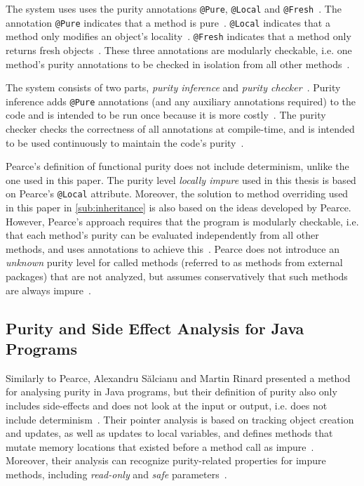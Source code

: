 \documentclass[a4paper,12pt]{article}
\begin{document}
The system uses uses the purity annotations \texttt{@Pure}, \texttt{@Local} and \texttt{@Fresh}~\cite{pearce2011jpure}. The annotation \texttt{@Pure} indicates that a method is pure~\cite{pearce2011jpure}. \texttt{@Local} indicates that a method only modifies an object's locality~\cite{pearce2011jpure}. \texttt{@Fresh} indicates that a method only returns fresh objects~\cite{pearce2011jpure}. These three annotations are modularly checkable, i.e. one method's purity annotations to be checked in isolation from all other methods~\cite{pearce2011jpure}.

The system consists of two parts, \textit{purity inference} and \textit{purity checker}~\cite{pearce2011jpure}. Purity inference adds \texttt{@Pure} annotations (and any auxiliary annotations required) to the code and is intended to be run once because it is more costly~\cite{pearce2011jpure}. The purity checker checks the correctness of all annotations at compile-time, and is intended to be used continuously to maintain the code's purity~\cite{pearce2011jpure}.

Pearce's definition of functional purity does not include determinism, unlike the one used in this paper. The purity level \textit{locally impure} used in this thesis is based on Pearce's \texttt{@Local} attribute. Moreover, the solution to method overriding used in this paper in \autoref{sub:inheritance} is also based on the ideas developed by Pearce. However, Pearce's approach requires that the program is modularly checkable, i.e. that each method's purity can be evaluated independently from all other methods, and uses annotations to achieve this~\cite{pearce2011jpure}.  Pearce does not introduce an \textit{unknown} purity level for called methods (referred to as methods from external packages) that are not analyzed, but assumes conservatively that such methods are always impure~\cite{pearce2011jpure}.


\subsection{Purity and Side Effect Analysis for Java Programs} \label{sub:Purity and Side Effect Analysis for Java Programs}

Similarly to Pearce, Alexandru S\u{a}lcianu and Martin Rinard presented a method for analysing purity in Java programs, but their definition of purity also only includes side-effects and does not look at the input or output, i.e. does not include determinism~\cite{salcianu}. Their pointer analysis is based on tracking object creation and updates, as well as updates to local variables, and defines methods that mutate memory locations that existed before a method call as impure~\cite{salcianu}. Moreover, their analysis can recognize purity-related properties for impure methods, including \textit{read-only} and \textit{safe} parameters~\cite{salcianu}.
\end{document}

